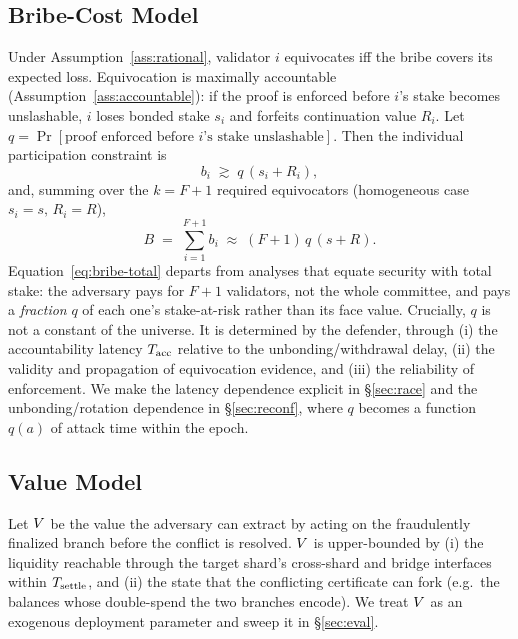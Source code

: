 \subsection{Bribe-Cost Model}
\label{sec:cost}

Under Assumption~\ref{ass:rational}, validator $i$ equivocates iff the bribe covers its expected
loss. Equivocation is maximally accountable (Assumption~\ref{ass:accountable}): if the proof is
enforced before $i$'s stake becomes unslashable, $i$ loses bonded stake $s_i$ and forfeits
continuation value $R_i$. Let $q=\Pr[\text{proof enforced before } i\text{'s stake unslashable}]$.
Then the individual participation constraint is
\begin{equation}
b_i \;\gtrsim\; q\,(s_i + R_i),
\label{eq:bribe-individual}
\end{equation}
and, summing over the $k=F+1$ required equivocators (homogeneous case $s_i=s,\,R_i=R$),
\begin{equation}
B \;=\; \sum_{i=1}^{F+1} b_i \;\approx\; (F+1)\,q\,(s + R).
\label{eq:bribe-total}
\end{equation}
Equation~\eqref{eq:bribe-total} departs from analyses that equate security with total stake: the
adversary pays for $F+1$ validators, not the whole committee, and pays a \emph{fraction} $q$ of each
one's stake-at-risk rather than its face value. Crucially, $q$ is not a constant of the universe. It
is determined by the defender, through (i) the accountability latency $T_{\mathrm{acc}}$ relative to the
unbonding/withdrawal delay, (ii) the validity and propagation of equivocation evidence, and (iii) the
reliability of enforcement. We make the latency dependence explicit in \S\ref{sec:race} and the
unbonding/rotation dependence in \S\ref{sec:reconf}, where $q$ becomes a function $q(a)$ of attack
time within the epoch.

\subsection{Value Model}
\label{sec:value}

Let $V$ be the value the adversary can extract by acting on the fraudulently finalized branch
before the conflict is resolved. $V$ is upper-bounded by (i) the liquidity reachable through the
target shard's cross-shard and bridge interfaces within $T_{\mathrm{settle}}$, and (ii) the state that the
conflicting certificate can fork (e.g.\ the balances whose double-spend the two branches encode). We
treat $V$ as an exogenous deployment parameter and sweep it in \S\ref{sec:eval}.

